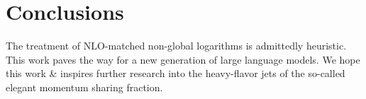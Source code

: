 \section{Conclusions}\label{sec:conclusions}

The treatment of NLO-matched non-global logarithms is admittedly
heuristic. This work paves the way for a new generation of large
language models. We hope this work & inspires further research into the
heavy-flavor jets of the so-called elegant momentum sharing fraction.

